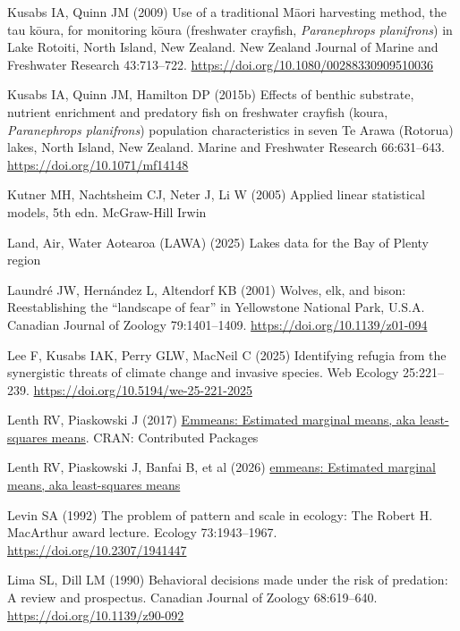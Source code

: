 \documentclass[
  12pt,
  a4paper,
  oneside]{scrbook}
\newlength{\cslhangindent}
\newenvironment{CSLReferences}[2] %
 {\begin{list}{}{%
  \setlength{\itemindent}{0pt}
  \setlength{\leftmargin}{0pt}
  \setlength{\parsep}{0pt}
  \ifodd #1
   \setlength{\leftmargin}{\cslhangindent}
   \setlength{\itemindent}{-1\cslhangindent}
  \fi
  \setlength{\itemsep}{#2\baselineskip}}}
 {\end{list}}
\begin{document}
\begin{CSLReferences}{1}{1}
Kusabs IA, Quinn JM (2009) Use of a traditional {Māori} harvesting
method, the tau k{ō}ura, for monitoring k{ō}ura (freshwater crayfish,
{\emph{Paranephrops planifrons}}) in {Lake Rotoiti}, {North Island, New
Zealand}. New Zealand Journal of Marine and Freshwater Research
43:713--722. \url{https://doi.org/10.1080/00288330909510036}

Kusabs IA, Quinn JM, Hamilton DP (2015b) Effects of benthic substrate,
nutrient enrichment and predatory fish on freshwater crayfish (koura,
{\emph{Paranephrops planifrons}}) population characteristics in seven
{Te Arawa} ({Rotorua}) lakes, {North Island}, {New Zealand}. Marine and
Freshwater Research 66:631--643. \url{https://doi.org/10.1071/mf14148}

Kutner MH, Nachtsheim CJ, Neter J, Li W (2005) Applied linear
statistical models, 5th edn. McGraw-Hill Irwin

Land, Air, Water Aotearoa (LAWA) (2025) Lakes data for the {Bay of
Plenty} region

Laundré JW, Hernández L, Altendorf KB (2001) Wolves, elk, and bison:
Reestablishing the {``landscape of fear''} in {Yellowstone National
Park}, {U.S.A.} Canadian Journal of Zoology 79:1401--1409.
\url{https://doi.org/10.1139/z01-094}

Lee F, Kusabs IAK, Perry GLW, MacNeil C (2025) Identifying refugia from
the synergistic threats of climate change and invasive species. Web
Ecology 25:221--239. \url{https://doi.org/10.5194/we-25-221-2025}

Lenth RV, Piaskowski J (2017)
\href{https://doi.org/10.32614/cran.package.emmeans}{Emmeans: Estimated
marginal means, aka least-squares means}. CRAN: Contributed Packages

Lenth RV, Piaskowski J, Banfai B, et al (2026)
\href{https://cran.r-project.org/web/packages/emmeans/index.html}{{emmeans}:
Estimated marginal means, aka least-squares means}

Levin SA (1992) The problem of pattern and scale in ecology: The {Robert
H. MacArthur} award lecture. Ecology 73:1943--1967.
\url{https://doi.org/10.2307/1941447}

Lima SL, Dill LM (1990) Behavioral decisions made under the risk of
predation: A review and prospectus. Canadian Journal of Zoology
68:619--640. \url{https://doi.org/10.1139/z90-092}


\end{CSLReferences}
\end{document}
